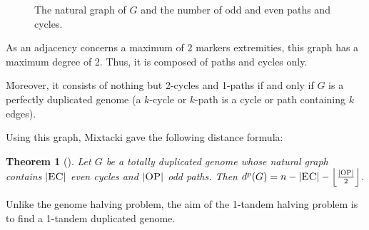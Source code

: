\documentclass[11pt,final,twoside,nofrench]{thlifl}
\newcommand{\fst}[1]{ \ensuremath{#1} }
\newcommand{\snd}[1]{ \ensuremath{\overline{#1}} }
\newcommand{\mfst}[1]{ \ensuremath{{- #1}} }
\newtheorem{theorem}{Theorem}
\begin{document}
\begin{figure}
\caption{The natural graph of $G$ and the number of odd
  and even paths and cycles.}
\label{fig:NG} 
\end{figure}
As an adjacency concerns a maximum of 2 markers extremities, this graph has
a maximum degree of 2. Thus, it is composed of paths and cycles only.

Moreover, it consists of nothing but 2-cycles and 1-paths if and only
if $G$ is a perfectly duplicated genome (a $k$-cycle or $k$-path is a
cycle or path containing $k$ edges).

Using this graph, Mixtacki gave the following distance formula:
\begin{theorem}[\cite{Mixtacki08}]
Let $G$ be a totally duplicated genome whose natural graph contains $|{{\textsc{EC}}}|$ even
cycles and $|{{\textsc{OP}}}|$ odd paths.
Then  $d^p(G) = n - |{{\textsc{EC}}}| - \left\lfloor \frac{\left|{{\textsc{OP}}}\right|}{2} \right\rfloor$.
\label{th:dp}
\end{theorem}
Unlike the genome halving problem, the aim of the 1-tandem halving
problem is to find a 1-tandem duplicated genome.
\end{document}
